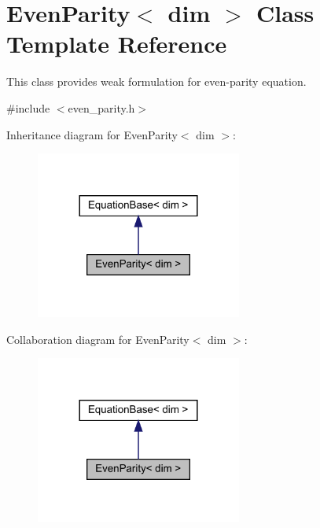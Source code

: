 \hypertarget{class_even_parity}{}\section{Even\+Parity$<$ dim $>$ Class Template Reference}
\label{class_even_parity}


This class provides weak formulation for even-\/parity equation.  




{\ttfamily \#include $<$even\+\_\+parity.\+h$>$}



Inheritance diagram for Even\+Parity$<$ dim $>$\+:\nopagebreak
\begin{figure}[H]
\begin{center}
\leavevmode
\includegraphics[width=192pt]{class_even_parity__inherit__graph}
\end{center}
\end{figure}


Collaboration diagram for Even\+Parity$<$ dim $>$\+:\nopagebreak
\begin{figure}[H]
\begin{center}
\leavevmode
\includegraphics[width=192pt]{class_even_parity__coll__graph}
\end{center}
\end{figure}
